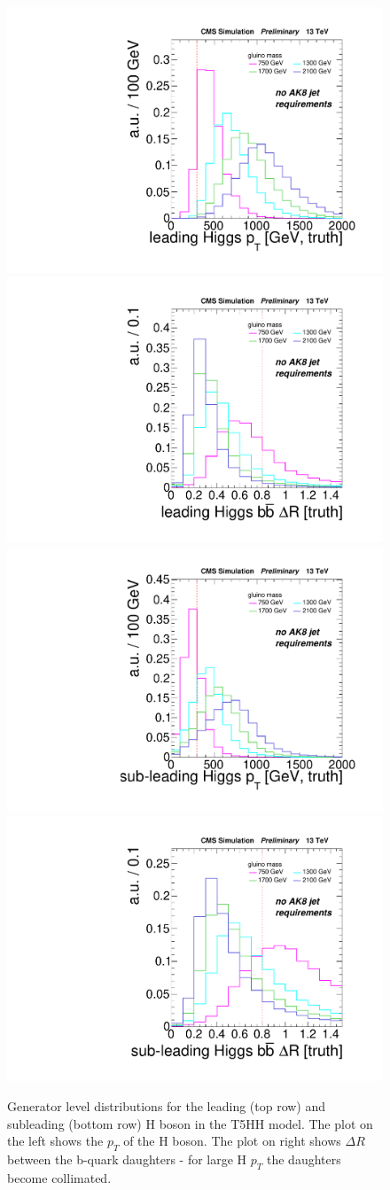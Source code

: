 \begin{figure}[hbp!]
\centering
\includegraphics[width=0.45\linewidth]{figs/SUS17006/leadHiggsPt.pdf}
\includegraphics[width=0.45\linewidth]{figs/SUS17006/leadHiggsDr.pdf}\\
\includegraphics[width=0.45\linewidth]{figs/SUS17006/subleadHiggsPt.pdf}
\includegraphics[width=0.45\linewidth]{figs/SUS17006/subleadHiggsDr.pdf}\\
\caption{
Generator level distributions for the leading (top row) and subleading (bottom row) H boson in the T5HH model. The plot on the left shows the $p_{T}$ of the H boson. The plot on right shows $\Delta R$ between the b-quark daughters - for large H $p_{T}$ the daughters become collimated.
}
\label{fig:GenHiggsBoost}
\end{figure}


